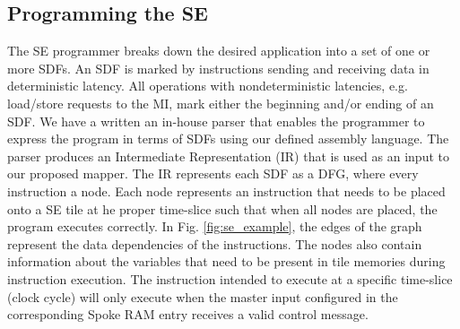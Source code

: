 \subsection{Programming the SE}
The SE programmer breaks down the desired application into a set of one or more SDFs.
An SDF is marked by instructions sending and receiving data in deterministic latency.
All operations with nondeterministic latencies, e.g. load/store requests to the MI, mark either the beginning and/or ending of an SDF.
We have a written an in-house parser that enables the programmer to express the program in terms of SDFs using our defined assembly language.
The parser produces an Intermediate Representation (IR) that is used as an input to our proposed mapper.
The IR represents each SDF as a DFG, where every instruction a node.
Each node represents an instruction that needs to be placed onto a SE tile at he proper time-slice such that when all nodes are placed, the program executes correctly. 
In Fig. \ref{fig:se_example}, the edges of the graph represent the data dependencies of the instructions. 
The nodes also contain information about the variables that need to be present in tile memories during instruction execution. 
The instruction intended to execute at a specific time-slice (clock cycle) will only execute when the master input configured in the corresponding Spoke RAM entry receives a valid control message.


